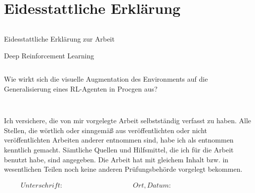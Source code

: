 \null\newpage
\section*{Eidesstattliche Erklärung}
\thispagestyle{empty}
\begin{verbatim}

\end{verbatim}

\begin{center}
\begin{LARGE}Eidesstattliche Erklärung zur Arbeit\end{LARGE} 
\newline
\newline
\begin{LARGE}Deep Reinforcement Learning\end{LARGE}
\newline
\begin{verbatim}

\end{verbatim} 

Wie wirkt sich die visuelle Augmentation des Environments auf die Generalisierung eines RL-Agenten in Procgen aus?
\end{center}
\begin{verbatim}


\end{verbatim}
Ich versichere, die von mir vorgelegte Arbeit selbstständig verfasst zu haben. Alle Stellen, die wörtlich oder sinngemäß aus veröffentlichten oder nicht veröffentlichten Arbeiten anderer entnommen sind, habe ich als entnommen kenntlich gemacht. Sämtliche Quellen und Hilfsmittel, die ich für die Arbeit benutzt habe, sind angegeben. Die Arbeit hat mit gleichem Inhalt bzw. in wesentlichen Teilen noch keine anderen Prüfungsbehörde vorgelegt bekommen.



\begin{displaymath}
\begin{array}{ll}
Unterschrift:~~~~~~~~~~~~~~~~~~~~~~~~~~~~~~~~~~~~~~~~~~
& Ort, Datum:~~~~~~~~~~~~~~~~~~~~~~~~~~~~~~~~~~~~~~~~~~
\end{array}
\end{displaymath}
